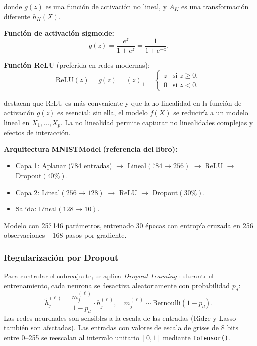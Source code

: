 \documentclass[12pt, a4paper]{article}
\newcommand{\relu}{\text{ReLU}}
\begin{document}
donde $g(z)$ es una función de activación no lineal, y $A_K$ es una
transformación diferente $h_K(X)$.

\textbf{Función de activación sigmoide:}
\begin{equation}
  g(z) = \frac{e^z}{1 + e^z} = \frac{1}{1 + e^{-z}}.
  \label{eq:sigmoide}
\end{equation}

\textbf{Función ReLU} (preferida en redes modernas):
\begin{equation}
  \relu(z) = g(z) = (z)_+ =
  \begin{cases} z & \text{si } z \geq 0, \\ 0 & \text{si } z < 0. \end{cases}
  \label{eq:relu}
\end{equation}

\citet[Cap.~10]{islp2023} destacan que ReLU es más conveniente y que
la no linealidad en la función de activación $g(z)$ es esencial:
sin ella, el modelo $f(X)$ se reduciría a un modelo lineal en
$X_1, \ldots, X_p$. La no linealidad permite capturar no linealidades
complejas y efectos de interacción.

\textbf{Arquitectura MNISTModel (referencia del libro):}
\begin{itemize}
  \item Capa 1: Aplanar (784 entradas) $\to$ Lineal$(784 \to 256)$
    $\to$ ReLU $\to$ Dropout$(40\%)$.
  \item Capa 2: Lineal$(256 \to 128)$ $\to$ ReLU $\to$ Dropout$(30\%)$.
  \item Salida: Lineal$(128 \to 10)$.
\end{itemize}
Modelo con 253\,146 parámetros, entrenado 30 épocas con entropía
cruzada en 256 observaciones -- 168 pasos por gradiente.

\subsubsection{Regularización por Dropout}

Para controlar el sobreajuste, se aplica \textit{Dropout Learning}
\citep[Sec.~10.7.3]{islp2023}: durante el entrenamiento, cada neurona
se desactiva aleatoriamente con probabilidad $p_d$:
\begin{equation}
  \tilde{h}^{(\ell)}_j =
  \frac{m_j^{(\ell)}}{1 - p_d}\cdot h^{(\ell)}_j,
  \quad m_j^{(\ell)} \sim \text{Bernoulli}(1 - p_d).
  \label{eq:dropout}
\end{equation}
Las redes neuronales son sensibles a la escala de las entradas
(Ridge y Lasso también son afectadas). Las entradas con valores de
escala de grises de 8 bits entre 0--255 se reescalan al intervalo
unitario $[0,1]$ mediante \texttt{ToTensor()}.
\end{document}
